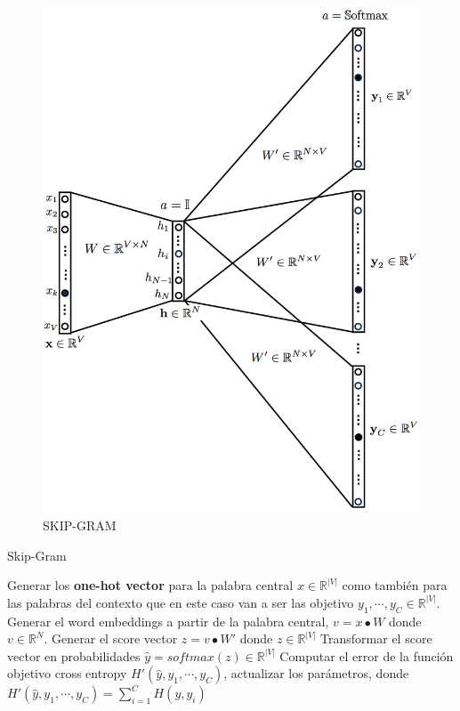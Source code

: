\begin{figure}
\begin{center}
    \includegraphics[width=\textwidth]{images/image211.png}
    \caption{SKIP-GRAM}
    \label{fig:word2vec_skip_gram}
\end{center}
\end{figure}


\begin{algorithm}
\caption{Skip-Gram}
\begin{algorithmic}[1]
\label{algo:skip_gram}
\STATE Generar los \textbf{one-hot vector} para la palabra central $x \in \mathbb{R}^{|V|}$ como también para las palabras del contexto que en este caso van a ser las objetivo $y_{1}, \cdots , y_{C} \in \mathbb{R}^{|V|}$.
\STATE Generar el word embeddings a partir de la palabra central, $v = x \bullet W$ donde $v \in \mathbb{R}^{N}$.
\STATE Generar el score vector $z = v \bullet W'$ donde $z \in \mathbb{R}^{|V|}$
\STATE Transformar el score vector en probabilidades $\hat{y} = softmax(z) \in \mathbb{R}^{|V|}$
\STATE Computar el error de la función objetivo cross entropy $H'(\hat{y}, y_{1}, \cdots , y_{C})$, actualizar los parámetros, donde $H'(\hat{y}, y_{1}, \cdots , y_{C}) = \sum_{i = 1}^{C} H (y, y_{i})$
\end{algorithmic}
\end{algorithm}


